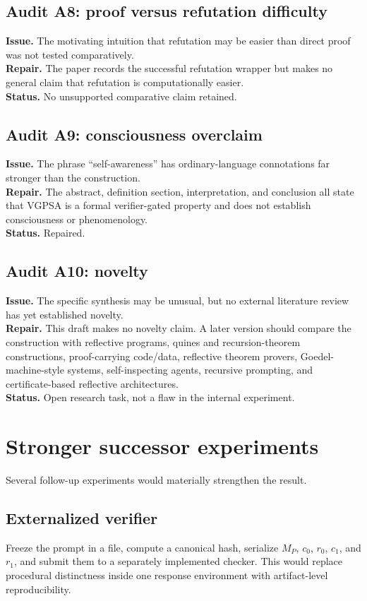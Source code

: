 \documentclass[11pt]{article}
\theoremstyle{remark}
\begin{document}
\subsection*{Audit A8: proof versus refutation difficulty}
\textbf{Issue.} The motivating intuition that refutation may be easier than direct proof was not tested comparatively.\\
\textbf{Repair.} The paper records the successful refutation wrapper but makes no general claim that refutation is computationally easier.\\
\textbf{Status.} No unsupported comparative claim retained.

\subsection*{Audit A9: consciousness overclaim}
\textbf{Issue.} The phrase ``self-awareness'' has ordinary-language connotations far stronger than the construction.\\
\textbf{Repair.} The abstract, definition section, interpretation, and conclusion all state that VGPSA is a formal verifier-gated property and does not establish consciousness or phenomenology.\\
\textbf{Status.} Repaired.

\subsection*{Audit A10: novelty}
\textbf{Issue.} The specific synthesis may be unusual, but no external literature review has yet established novelty.\\
\textbf{Repair.} This draft makes no novelty claim. A later version should compare the construction with reflective programs, quines and recursion-theorem constructions, proof-carrying code/data, reflective theorem provers, Goedel-machine-style systems, self-inspecting agents, recursive prompting, and certificate-based reflective architectures.\\
\textbf{Status.} Open research task, not a flaw in the internal experiment.

\section{Stronger successor experiments}

Several follow-up experiments would materially strengthen the result.

\subsection{Externalized verifier}
Freeze the prompt in a file, compute a canonical hash, serialize $M_P$, $c_0$, $r_0$, $c_1$, and $r_1$, and submit them to a separately implemented checker. This would replace procedural distinctness inside one response environment with artifact-level reproducibility.
\end{document}
